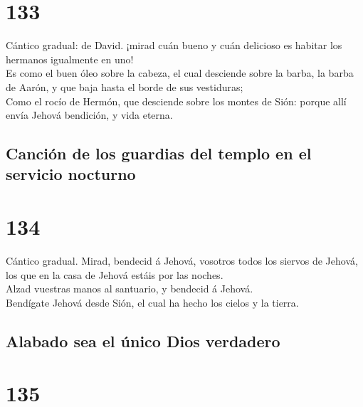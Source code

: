 \hypertarget{section-19-133}{%
\section{133}\label{section-19-133}}

 Cántico gradual: de David. ¡mirad cuán bueno y cuán
delicioso es habitar los hermanos igualmente en uno!\\
 Es como el buen óleo sobre la cabeza, el cual desciende
sobre la barba, la barba de Aarón, y que baja hasta el borde de sus
vestiduras;\\
 Como el rocío de Hermón, que desciende sobre los montes
de Sión: porque allí envía Jehová bendición, y vida eterna.

\hypertarget{canciuxf3n-de-los-guardias-del-templo-en-el-servicio-nocturno}{%
\subsection{Canción de los guardias del templo en el servicio
nocturno}\label{canciuxf3n-de-los-guardias-del-templo-en-el-servicio-nocturno}}

\hypertarget{section-19-134}{%
\section{134}\label{section-19-134}}

 Cántico gradual. Mirad, bendecid á Jehová, vosotros todos
los siervos de Jehová, los que en la casa de Jehová estáis por las
noches.\\
 Alzad vuestras manos al santuario, y bendecid á Jehová.\\
 Bendígate Jehová desde Sión, el cual ha hecho los cielos
y la tierra.

\hypertarget{alabado-sea-el-uxfanico-dios-verdadero}{%
\subsection{Alabado sea el único Dios
verdadero}\label{alabado-sea-el-uxfanico-dios-verdadero}}

\hypertarget{section-19-135}{%
\section{135}\label{section-19-135}}

